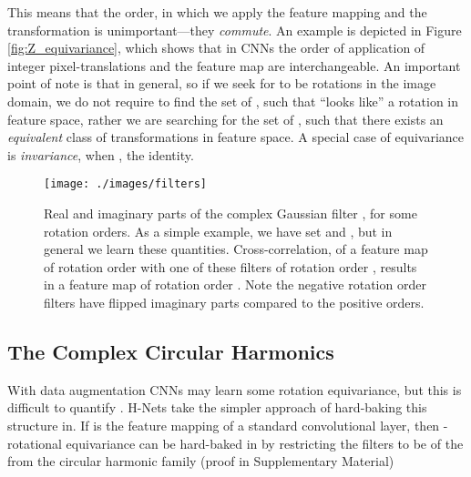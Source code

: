 \documentclass[10pt,twocolumn,letterpaper]{article}
\begin{document}
This means that the order, in which we apply the feature mapping and the 
transformation is unimportant---they \emph{commute}. An example is depicted 
in Figure \ref{fig:Z_equivariance}, which shows that in CNNs the order of 
application of integer pixel-translations and the feature map are interchangeable.
An important point of note is that  in general, so if we 
seek for  to be rotations in the image domain, we do not require 
to find the set of , such that  ``looks like'' a rotation in 
feature space, rather we are searching for the set of , such that there 
exists an \emph{equivalent} class of transformations  in feature 
space. A special case of equivariance is \emph{invariance}, when 
, the identity.
\begin{figure}[t]
	\texttt{[image: ./images/filters]}
    \caption{Real and imaginary parts of the complex Gaussian filter 
    , for
    some rotation orders. As a simple example, we have set 
    and , but in general we learn these quantities. 
    Cross-correlation, of a feature map 
    of rotation order  with one of these filters of rotation order 
    , results in a feature map of rotation order . Note the negative rotation order filters have flipped imaginary parts compared to the positive orders.}
    \label{fig:circular_harmonics}
\vspace{-1em}
\end{figure}
\subsection{The Complex Circular Harmonics}
\label{sec:circular_harmonics}
With data augmentation CNNs may learn some rotation equivariance, but this is difficult to quantify \cite{lenc2015equivariance}. H-Nets take the simpler approach of hard-baking this structure in. If  is the feature mapping of a standard convolutional layer, then -rotational equivariance can be hard-baked in by restricting the filters to be of the from the circular harmonic family (proof in Supplementary Material)
\end{document}
